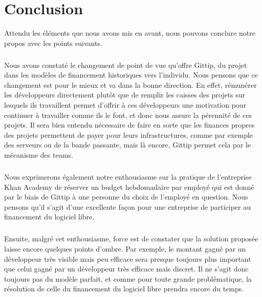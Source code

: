\chapter*{Conclusion}



Attendu les éléments que nous avons mis en avant, nous pouvons conclure notre
propos avec les points suivants.

\paragraph{}
Nous avons constaté le changement de point de vue qu'offre Gittip, du projet
dans les modèles de financement historiques vers l'individu.
Nous pensons que ce changement est pour le mieux et va dans la bonne
direction.
En effet, rémunérer les développeurs directement plutôt que de remplir les
caisses des projets sur lesquels ils travaillent permet d'offrir à ces
développeurs une motivation pour continuer à travailler comme ils le font, et
donc nous assure la pérennité de ces projets.
Il sera bien entendu nécessaire de faire en sorte que les finances propres des
projets permettent de payer pour leurs infrastructures, comme par exemple des
serveurs ou de la bande passante, mais là encore, Gittip permet cela par le
mécanisme des teams.

\paragraph{}
Nous exprimerons également notre enthousiasme sur la pratique de l'entreprise
Khan Academy de réserver un budget hebdomadaire par employé qui est donné par
le biais de Gittip à une personne du choix de l'employé en question.
Nous pensons qu'il s'agit d'une excellente façon pour une entreprise de
participer au financement du logiciel libre.

\paragraph{}
Ensuite, malgré cet enthousiasme, force est de constater que la solution
proposée laisse encore quelques points d'ombre. Par exemple, le montant gagné
par un développeur très visible mais peu efficace sera presque toujours plus
important que celui gagné par un développeur très efficace mais discret.
Il ne s'agit donc toujours pas du modèle parfait, et comme pour toute grande
problématique, la résolution de celle du financement du logiciel libre prendra
encore du temps.

